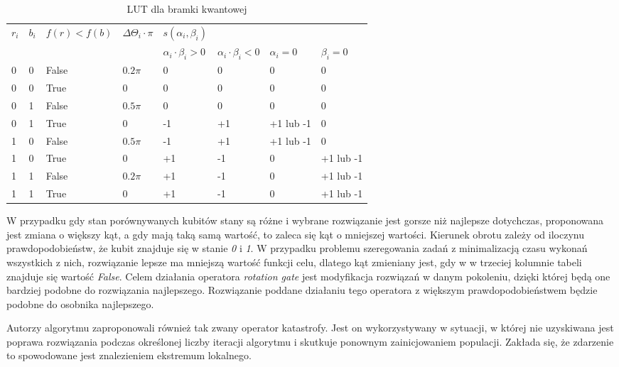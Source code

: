\begin{table}[h]
\label{LUT_TAB}
\begin{tabular}{l l l l l l l l}
\hline
$r_i$ & $b_i$ & $f(r)<f(b)$ & $\Delta\Theta_i \cdot \pi$ & $s(\alpha_i,\beta_i)$ & & & \\
\cline{5-8} 
& & & & $\alpha_i \cdot \beta_i > 0$ & $\alpha_i \cdot \beta_i < 0$ & $\alpha_i = 0$ & $\beta_i = 0$ \\
\hline
0 & 0 & False & $0.2\pi$ & 0 & 0 & 0 & 0\\
0 & 0 & True  & 0        & 0 & 0 & 0 & 0\\
0 & 1 & False & $0.5\pi$ & 0 & 0 & 0 & 0\\
0 & 1 & True  & 0        & -1 & +1 & +1 lub -1 & 0\\
1 & 0 & False & $0.5\pi$ & -1 & +1 & +1 lub -1 & 0\\
1 & 0 & True  & 0        & +1 & -1 & 0 & +1 lub -1\\
1 & 1 & False & $0.2\pi$ & +1 & -1 & 0 & +1 lub -1\\
1 & 1 & True  & 0        & +1 & -1 & 0 & +1 lub -1\\
\hline
\end{tabular}
\caption{LUT dla bramki kwantowej}
\end{table}

W przypadku gdy stan porównywanych kubitów stany są różne i wybrane rozwiązanie jest gorsze niż najlepsze dotychczas, proponowana jest zmiana o większy kąt, a gdy mają taką samą wartość, to zaleca się kąt o mniejszej wartości. Kierunek obrotu zależy od iloczynu prawdopodobieństw, że kubit znajduje się w stanie \textit{0} i \textit{1}. W przypadku problemu szeregowania zadań z minimalizacją czasu wykonań wszystkich z nich, rozwiązanie lepsze ma mniejszą wartość funkcji celu, dlatego kąt zmieniany jest, gdy w w trzeciej kolumnie tabeli znajduje się wartość \textit{False}. Celem działania operatora \textit{rotation gate} jest  modyfikacja rozwiązań w danym pokoleniu, dzięki której będą one bardziej podobne do rozwiązania najlepszego. Rozwiązanie poddane działaniu tego operatora z większym prawdopodobieństwem będzie podobne do osobnika najlepszego.

Autorzy algorytmu zaproponowali również tak zwany operator katastrofy. Jest on wykorzystywany w sytuacji, w której nie uzyskiwana jest poprawa rozwiązania podczas określonej liczby iteracji algorytmu i skutkuje ponownym zainicjowaniem populacji. Zakłada się, że zdarzenie to spowodowane jest znalezieniem ekstremum lokalnego.

